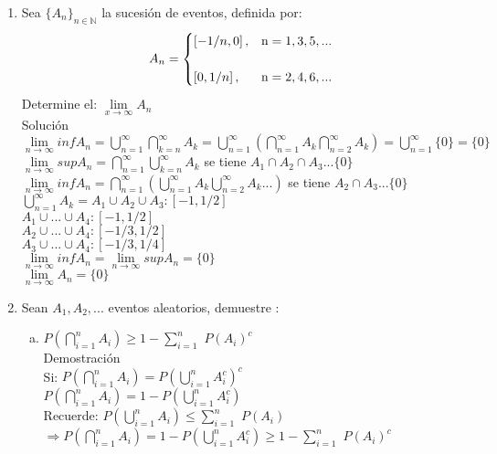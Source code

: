 \documentclass[12pt]{article}
\begin{document}
\begin{enumerate}
\item Sea $\{A_n\}_{n\in\mathbb{N}}$ la sucesión de eventos, definida por:
\[A_n = \begin{cases} 
      \left[-1/n,0\right] ,& \mbox n= 1,3,5,...        \\[0.5cm]
      \left[0,1/n\right], & \mbox n = 2,4,6,...
 \end{cases} \]
Determine el: $\lim\limits_{x \to \infty}A_n$\\[0.2cm]
Solución\\[0.2cm]
$\lim\limits_{n \to \infty}{inf}A_n =\displaystyle\bigcup_{n=1}^{\infty}\displaystyle\bigcap_{k=n}^{\infty}A_k = \displaystyle\bigcup_{n=1}^{\infty}\left(\displaystyle\bigcap_{n=1}^{\infty}A_k\displaystyle\bigcap_{n=2}^{\infty}A_k\right)=\displaystyle\bigcup_{n=1}^{\infty}{ \{0} \}={ \{0} \} $\\[0.2cm]
$\lim\limits_{n \to \infty}{sup}A_n =\displaystyle\bigcap_{n=1}^{\infty}\displaystyle\bigcup_{k=n}^{\infty}A_k$ se tiene $A_1\cap A_2\cap A_3...{ \{0} \} $\\[0.2cm]
$\lim\limits_{n \to \infty}{inf}A_n = \displaystyle\bigcap_{n=1}^{\infty}\left(\displaystyle\bigcup_{n=1}^{\infty}A_k\displaystyle\bigcup_{n=2}^{\infty}A_k...\right)$ se tiene $ A_2\cap A_3...{ \{0} \}$\\[0.2cm]
$\displaystyle\bigcup_{n=1}^{\infty}A_k = A_1\cup A_2\cup A_3 :\left[-1,1/2\right] $\\[0.2cm]
$A_1\cup ... \cup A_4:\left[-1,1/2\right] $\\[0.2cm]
$A_2\cup ... \cup A_4:\left[-1/3,1/2\right]$\\[0.2cm]
$A_3\cup ... \cup A_4:\left[-1/3,1/4\right]$\\[0.2cm]
$\lim\limits_{n \to \infty}{inf}A_n = \lim\limits_{n \to \infty}{sup}A_n ={ \{0} \}$\\[0.2cm]
$\lim\limits_{n \to \infty}A_n ={ \{0} \} $

\item Sean $A_1,A_2,...$ eventos aleatorios, demuestre :
\begin{enumerate}[a)]
\item $P\left(\displaystyle\bigcap_{i=1}^{n}{A_i}\right)\geq 1-\displaystyle\sum_{i=1}^{n}$ $P\left(A_{i}\right)^c$\\[0.2cm]
Demostración\\[0.2cm]
Si: $P\left(\displaystyle\bigcap_{i=1}^{n}{A_i}\right)= P\left(\displaystyle\bigcup_{i=1}^{n}{A_i^c}\right)^c$\\[0.2cm]
$P\left(\displaystyle\bigcap_{i=1}^{n}{A_i}\right)= 1- P\left(\displaystyle\bigcup_{i=1}^{n}{A_i^c}\right)$\\[0.2cm]
Recuerde: $P\left(\displaystyle\bigcup_{i=1}^{n}{A_i}\right) \leqslant\displaystyle\sum_{i=1}^{n}$ $P\left(A_{i}\right)$\\[0.2cm]
$\Rightarrow P\left(\displaystyle\bigcap_{i=1}^{n}{A_i}\right)= 1- P\left(\displaystyle\bigcup_{i=1}^{n}{A_i^c}\right) \geqslant 1-\displaystyle\sum_{i=1}^{n}$ $P\left(A_{i}\right)^c $


\end{enumerate}
\end{enumerate}
\end{document}
